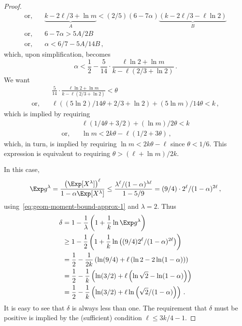 \begin{proof}
\begin{align*}
    \text{or},\quad&\underbrace{k - 2\ell/3 + \ln m}_{A} < (2/5)(6 - 7 \alpha) \underbrace{ ( k -2\ell/3 - \ell \ln 2) }_{B}\\
    \text{or},\quad&6 - 7 \alpha > 5A/2B\\
    \text{or},\quad& \alpha < 6/7 - 5A/14B\,,
\end{align*}
which, upon simplification, becomes
\[
    \alpha < \frac{1}{2} -\frac{5}{14}\cdot \frac{\ell \ln 2 + \ln m}{k - \ell(2/3 + \ln 2)}
    \,.
\]
We want
\begin{align*}
    &\frac{5}{14}\cdot \frac{\ell \ln 2 + \ln m}{k - \ell(2/3 + \ln 2)} < \theta \\
    \text{or,}\quad& \ell \left( (5 \ln 2)/14\theta + 2/3 + \ln 2\right) + (5 \ln m)/14\theta < k 
    \,,
\end{align*}
which is implied by requiring
\begin{align*}
    &\ell \left( 1/4\theta + 3/2 \right) + (\ln m)/2\theta < k \\
    \text{or,}\quad&\ln m < 2k\theta - \ell(1/2 + 3\theta)
    \,,
\end{align*}
which, in turn, is implied by requiring $\ln m < 2k\theta - \ell$ since $\theta < 1/6$. 
This expression is equivalent to requiring $\theta > (\ell + \ln m)/2k$.

In this case, 
\[
    \Exp g^\lambda 
    = \frac{\left(\Exp[X^\lambda] \right)^\ell}{1 - \alpha \Exp[X^\lambda]} 
    \leq \frac{\lambda^\ell/(1 - \alpha)^{\lambda \ell}}{1 - 5/9}
    = (9/4) \cdot 2^\ell/(1-\alpha)^{2\ell}
    \,,
\]
using~\eqref{eq:geom-moment-bound-approx-1} and $\lambda = 2$. 
Thus
\begin{align*}
    \delta
    &= 1 - \frac{1}{\lambda}\left(1 + \frac{1}{k} \ln \Exp g^\lambda \right) \\
    &\geq 1 - \frac{1}{2}\left(1 + \frac{1}{k} \ln \left( (9/4)  2^\ell/(1-\alpha)^{2\ell} \right) \right) \\
    &= \frac{1}{2} - \frac{1}{2k} \left(\ln(9/4) + \ell \left( \ln 2 - 2 \ln(1-\alpha) \right) \right) \\
    &= \frac{1}{2} - \frac{1}{k} \left(\ln(3/2) + \ell \left( \ln \sqrt{2} - \ln(1-\alpha) \right) \right)\\
    &= \frac{1}{2} - \frac{1}{k} \left(\ln(3/2) + \ell \ln \left(  \sqrt{2}/(1-\alpha) \right) \right)
    \,.
\end{align*}
It is easy to see that $\delta$ is always less than one.
The requirement that $\delta$ must be positive is 
implied by the (sufficient) condition $\ell \leq 3k/4 -1$.


\end{proof}
